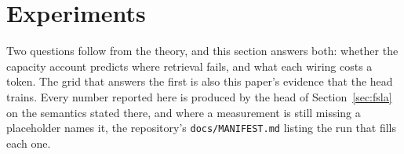 %
%
%
\section{Experiments}
\label{sec:experiments}

Two questions follow from the theory, and this section answers both: whether the capacity account predicts where retrieval fails, and what each wiring costs a token. The grid that answers the first is also this paper's evidence that the head trains. Every number reported here is produced by the head of Section~\ref{sec:fsla} on the semantics stated there, and where a measurement is still missing a placeholder names it, the repository's \texttt{docs/MANIFEST.md} listing the run that fills each one.

